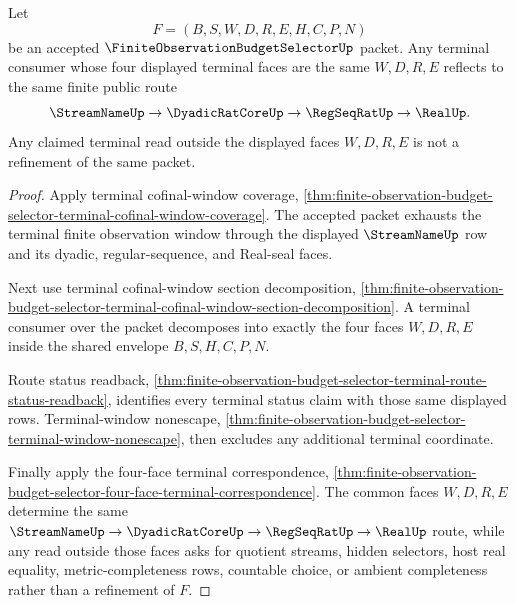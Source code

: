 \begin{theorem}
\label{thm:finite-observation-budget-selector-terminal-cofinal-window-route-reflection}
Let
$$
F=(B,S,W,D,R,E,H,C,P,N)
$$
be an accepted $\FiniteObservationBudgetSelectorUp$ packet. Any terminal consumer whose four displayed terminal faces are the same $W,D,R,E$ reflects to the same finite public route
$$
\StreamNameUp \to \DyadicRatCoreUp \to \RegSeqRatUp \to \RealUp .
$$
Any claimed terminal read outside the displayed faces $W,D,R,E$ is not a refinement of the same packet.
\end{theorem}
\begin{proof}
Apply terminal cofinal-window coverage, \autoref{thm:finite-observation-budget-selector-terminal-cofinal-window-coverage}. The accepted packet exhausts the terminal finite observation window through the displayed $\StreamNameUp$ row and its dyadic, regular-sequence, and Real-seal faces.

Next use terminal cofinal-window section decomposition, \autoref{thm:finite-observation-budget-selector-terminal-cofinal-window-section-decomposition}. A terminal consumer over the packet decomposes into exactly the four faces $W,D,R,E$ inside the shared envelope $B,S,H,C,P,N$.

Route status readback, \autoref{thm:finite-observation-budget-selector-terminal-route-status-readback}, identifies every terminal status claim with those same displayed rows. Terminal-window nonescape, \autoref{thm:finite-observation-budget-selector-terminal-window-nonescape}, then excludes any additional terminal coordinate.

Finally apply the four-face terminal correspondence, \autoref{thm:finite-observation-budget-selector-four-face-terminal-correspondence}. The common faces $W,D,R,E$ determine the same $\StreamNameUp \to \DyadicRatCoreUp \to \RegSeqRatUp \to \RealUp$ route, while any read outside those faces asks for quotient streams, hidden selectors, host real equality, metric-completeness rows, countable choice, or ambient completeness rather than a refinement of $F$.
\end{proof}

